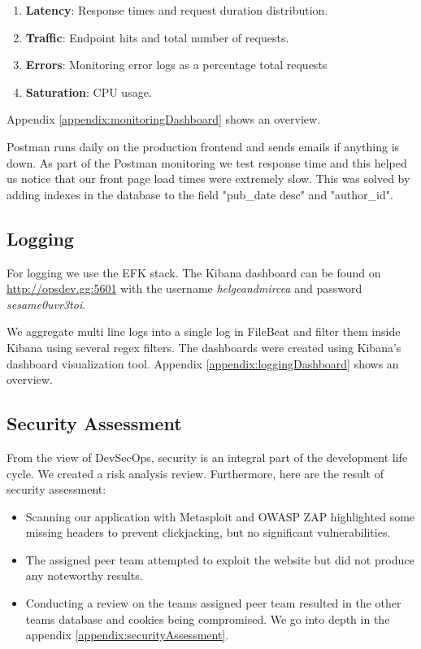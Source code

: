 \documentclass{article}
\begin{document}
\begin{enumerate}
    \item \textbf{Latency}: Response times and request duration distribution.
    \item \textbf{Traffic}: Endpoint hits and total number of requests.
    \item \textbf{Errors}: Monitoring error logs as a percentage total requests
    \item \textbf{Saturation}: CPU usage.
\end{enumerate}
Appendix \ref{appendix:monitoringDashboard} shows an overview. 
\newline

Postman runs daily on the production frontend and sends emails if anything is down. As part of the Postman monitoring we test response time and this helped us notice that our front page load times were extremely slow. This was solved by adding indexes in the database to the field "pub\_date desc" and "author\_id". 

\subsection{Logging}

For logging we use the EFK stack. The Kibana dashboard can be found on \url{http://opsdev.gg:5601} with the username \emph{helgeandmircea} and password \emph{sesame0uvr3toi}. 

We aggregate multi line logs into a single log in FileBeat and filter them inside Kibana using several regex filters. The dashboards were created using Kibana's dashboard visualization tool. Appendix \ref{appendix:loggingDashboard} shows an overview.


\subsection{Security Assessment}

From the view of DevSecOps, security is an integral part of the development life cycle. We created a risk analysis review. Furthermore, here are the result of security assessment: 

\begin{itemize}
    \item Scanning our application with Metasploit and OWASP ZAP highlighted some missing headers to prevent clickjacking, but no significant vulnerabilities. 
    \item The assigned peer team attempted to exploit the website but did not produce any noteworthy results. 
    \item Conducting a review on the teams assigned peer team resulted in the other teams database and cookies being compromised. We go into depth in the appendix \ref{appendix:securityAssessment}.
\end{itemize}
\end{document}
